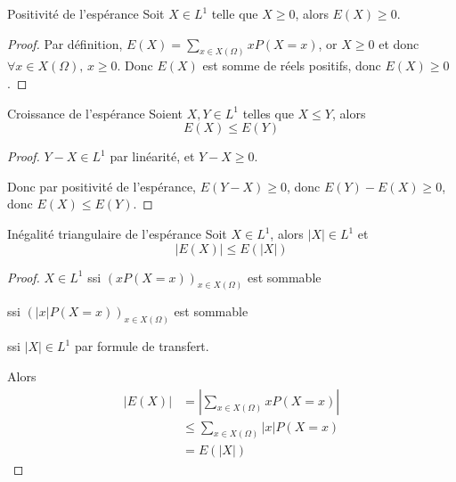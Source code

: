 \begin{proposition}{Positivité de l'espérance}{}
    Soit $X \in L^1$ telle que $X \geqslant 0$, alors $E(X) \geqslant 0$.    
\end{proposition}

\begin{proof}
    Par définition, $E(X) = \sum_{x \in X(\Omega)} x P(X = x)$, 
    or $X \geqslant 0$ et donc $\forall x \in X(\Omega), \, x \geqslant 0$.
    Donc $E(X)$ est somme de réels positifs, donc $E(X) \geqslant 0$.
\end{proof}

\begin{proposition}{Croissance de l'espérance}{}
    Soient $X, Y \in L^1$ telles que $X \leqslant Y$, alors 
    $$ E(X) \leqslant E(Y) $$
    
\end{proposition}


\begin{proof}
    $Y - X \in L^1$ par linéarité, et $Y - X \geqslant 0$.

    Donc par positivité de l'espérance, $E(Y - X) \geqslant 0$, donc 
    $E(Y) - E(X) \geqslant 0$, donc $E(X) \leqslant E(Y)$.
\end{proof}

\begin{proposition}{Inégalité triangulaire de l'espérance}{}
    Soit $X \in L^1$, alors $|X| \in L^1$ et
    $$ |E(X)| \leqslant E(|X|) $$
    
\end{proposition}


\begin{proof}
    $X \in L^1$ ssi $(x P(X = x))_{x \in X(\Omega)}$ est sommable

    ssi $(|x| P(X = x))_{x \in X(\Omega)}$ est sommable

    ssi $|X| \in L^1$ par formule de transfert.

    Alors 
    \begin{align}
        |E(X)| & = \left| \sum_{x \in X(\Omega)} x P(X = x) \right| \\
        & \leqslant \sum_{x \in X(\Omega)} |x| P(X = x) \\
        & = E(|X|)
    \end{align} 
\end{proof}

